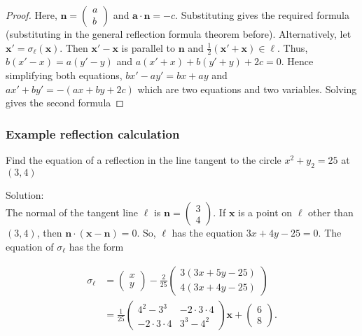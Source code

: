 \begin{proof}
 Here, \( \mathbf{n} = \begin{pmatrix} a \\ b \end{pmatrix}  \) and \( \mathbf{a} \cdot \mathbf{n} = -c\). Substituting gives the required
 formula (substituting in the general reflection formula theorem before). Alternatively, let \( \mathbf{x}' = \sigma_{\ell} \left( \mathbf{x} \right) \). Then 
 \( \mathbf{x'} - \mathbf{x} \) is parallel to \( \mathbf{n}\) and \( \frac{1}{2} \left( \mathbf{x}' + \mathbf{x} \right) \in  \ell\). Thus,
 \( b(x' - x) = a \left( y' - y \right) \) and \( a \left( x' + x \right) + b \left( y' + y \right) + 2c  = 0\). Hence simplifying both equations,
   \( bx' - ay' = bx + ay\) and \( ax' + by' = - \left( ax + by + 2c \right) \) which are two equations and two variables. Solving gives the 
   second formula
\end{proof}

\subsubsection{Example reflection calculation}

\begin{problem}
 Find the equation of a reflection in the line tangent to the circle \( x^{2} + y_{2} = 25 \) at \( \left( 3, 4 \right) \)
\end{problem}

Solution: \\
The normal of the tangent line \( \ell \) is \( \mathbf{n} = \begin{pmatrix} 3 \\ 4 \end{pmatrix}  \). If \( \mathbf{x} \) is a point on
\( \ell \) other than \( \left( 3, 4 \right) \), then \( \mathbf{n} \cdot \left( \mathbf{x} - \mathbf{n} \right) = 0\). So, \( \ell \) has the equation
\( 3x + 4y - 25 = 0 \). The equation of \( \sigma_{\ell} \) has the form

\begin{align*}
  \sigma_{\ell} &= \begin{pmatrix} x \\ y \end{pmatrix} - \frac{2}{25} \begin{pmatrix} 3 \left( 3x + 5y - 25 \right) \\  4 \left( 3x + 4y - 25 \right) \end{pmatrix} \\
                &= \frac{1}{25} \begin{pmatrix} 4^{2} - 3^{3} & -2 \cdot 3 \cdot 4 \\ -2 \cdot 3 \cdot 4 & 3^{3} - 4^{2} \end{pmatrix} \mathbf{x} + \begin{pmatrix} 6 \\ 8 \end{pmatrix} 
.\end{align*}

